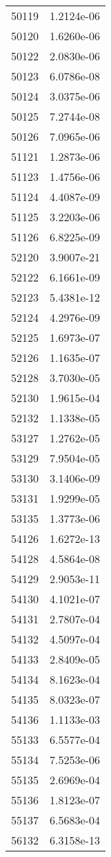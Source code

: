 \begin{table}[h!]
\begin{tabular}{|| c || c |}
50119 & 1.2124e-06 \\
50120 & 1.6260e-06 \\
50122 & 2.0830e-06 \\
50123 & 6.0786e-08 \\
50124 & 3.0375e-06 \\
50125 & 7.2744e-08 \\
50126 & 7.0965e-06 \\
51121 & 1.2873e-06 \\
51123 & 1.4756e-06 \\
51124 & 4.4087e-09 \\
51125 & 3.2203e-06 \\
51126 & 6.8225e-09 \\
52120 & 3.9007e-21 \\
52122 & 6.1661e-09 \\
52123 & 5.4381e-12 \\
52124 & 4.2976e-09 \\
52125 & 1.6973e-07 \\
52126 & 1.1635e-07 \\
52128 & 3.7030e-05 \\
52130 & 1.9615e-04 \\
52132 & 1.1338e-05 \\
53127 & 1.2762e-05 \\
53129 & 7.9504e-05 \\
53130 & 3.1406e-09 \\
53131 & 1.9299e-05 \\
53135 & 1.3773e-06 \\
54126 & 1.6272e-13 \\
54128 & 4.5864e-08 \\
54129 & 2.9053e-11 \\
54130 & 4.1021e-07 \\
54131 & 2.7807e-04 \\
54132 & 4.5097e-04 \\
54133 & 2.8409e-05 \\
54134 & 8.1623e-04 \\
54135 & 8.0323e-07 \\
54136 & 1.1133e-03 \\
55133 & 6.5577e-04 \\
55134 & 7.5253e-06 \\
55135 & 2.6969e-04 \\
55136 & 1.8123e-07 \\
55137 & 6.5683e-04 \\
56132 & 6.3158e-13 \\

\end{tabular}
\end{table}
